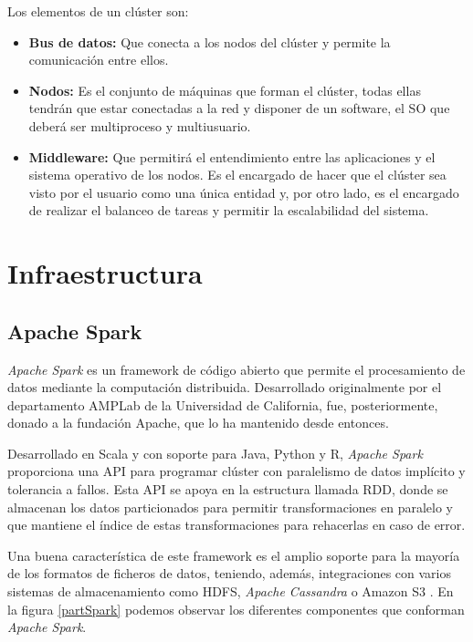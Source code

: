 Los elementos de un clúster son:

\begin{itemize}
\item \textbf{Bus de datos:} Que conecta a los nodos del clúster y permite la comunicación entre ellos.

\item \textbf{Nodos:} Es el conjunto de máquinas que forman el clúster, todas ellas tendrán que estar conectadas a la red y disponer de un software, el \gls{SO} que deberá ser multiproceso y multiusuario.

\item \textbf{Middleware:} Que permitirá el entendimiento entre las aplicaciones y el sistema operativo de los nodos. Es el encargado de hacer que el clúster sea visto por el usuario como una única entidad y, por otro lado, es el encargado de realizar el balanceo de tareas y permitir la escalabilidad del sistema.
\end{itemize}

\clearpage
\section{Infraestructura}
\subsection{Apache Spark \label{sparkEA}}
\textit{Apache Spark} \cite{spark} es un \gls{framework} de código abierto que permite el procesamiento de datos mediante la computación distribuida. Desarrollado originalmente por el departamento AMPLab de la Universidad de California, fue, posteriormente, donado a la fundación Apache, que lo ha mantenido desde entonces. 

Desarrollado en Scala \cite{scala} y con soporte para Java, Python y R, \textit{Apache Spark} proporciona una \gls{API} para programar clúster con paralelismo de datos implícito y tolerancia a fallos. Esta \gls{API} se apoya en la estructura llamada \gls{RDD}, donde se almacenan los datos particionados para permitir transformaciones en paralelo y que mantiene el índice de estas transformaciones para rehacerlas en caso de error.

Una buena característica de este \gls{framework} es el amplio soporte para la mayoría de los formatos de ficheros de datos, teniendo, además, integraciones con varios sistemas de almacenamiento como \gls{HDFS}, \textit{Apache Cassandra} \cite{cassandra} o Amazon S3 \cite{aws}. En la figura \ref{partSpark} podemos observar los diferentes componentes que conforman \textit{Apache Spark}.

